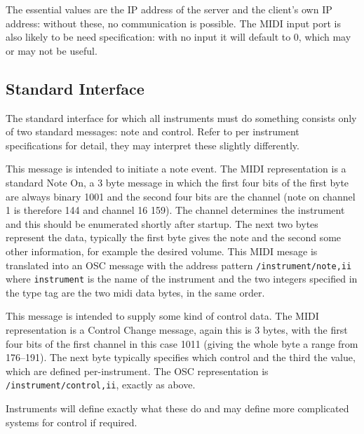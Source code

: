 \documentclass[../main.tex]{subfiles}
\begin{document}
The essential values are the IP address of the server and the client's own IP address: without these, no communication is possible. The MIDI input port is
also likely to be need specification: with no input it will default to 0, which may or may not be useful.

\subsection{Standard Interface}
The standard interface for which all instruments must do something consists only of two standard messages: note and control.
Refer to per instrument specifications for detail, they may interpret these slightly differently.
\begin{description} [style=multiline, labelwidth=\widthof{\bfseries Control}]
	\item [Note] This message is intended to initiate a note event. The MIDI representation is a standard Note On, a 3 byte message in which the first
			   four bits of the first byte are always binary 1001 and the second four bits are the channel (note on channel 1 is therefore 144 and
			    channel 16 159). The channel determines the instrument
			   and this should be enumerated shortly after startup. The next two bytes represent the data, typically the first byte gives the
			   note and the second some other information, for example the desired volume. This MIDI mesage is translated into an OSC message
			   with the address pattern \texttt{/instrument/note,ii} where \texttt{instrument} is the name of the instrument and the two integers 
			   specified in the type tag are the two midi data bytes, in the same order.
	\item [\hbox{Control}] This message is intended to supply some kind of control data. The MIDI representation is a Control Change message, again 
			       this is 3 bytes, with the first four bits of the first channel in this case 1011 (giving the whole byte a range from 176--191). The 
			       next byte typically specifies which control and the third the value, which are defined per-instrument.
			       The OSC representation is \texttt{/instrument/control,ii}, exactly as above.
			 
\end{description}

Instruments will define exactly what these do and may define more complicated systems for control if required.
\end{document}
